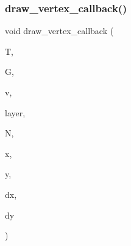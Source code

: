 \subsubsection{\texorpdfstring{draw\+\_\+vertex\+\_\+callback()}{draw\_vertex\_callback()}}
{\footnotesize\ttfamily void draw\+\_\+vertex\+\_\+callback (\begin{DoxyParamCaption}\item[{\mbox{\hyperlink{classtree}{tree}} $\ast$}]{T,  }\item[{\mbox{\hyperlink{classmp__graphics}{mp\+\_\+graphics}} $\ast$}]{G,  }\item[{\mbox{\hyperlink{galois_8h_a09fddde158a3a20bd2dcadb609de11dc}{I\+NT}} $\ast$}]{v,  }\item[{\mbox{\hyperlink{galois_8h_a09fddde158a3a20bd2dcadb609de11dc}{I\+NT}}}]{layer,  }\item[{\mbox{\hyperlink{classtree__node}{tree\+\_\+node}} $\ast$}]{N,  }\item[{\mbox{\hyperlink{galois_8h_a09fddde158a3a20bd2dcadb609de11dc}{I\+NT}}}]{x,  }\item[{\mbox{\hyperlink{galois_8h_a09fddde158a3a20bd2dcadb609de11dc}{I\+NT}}}]{y,  }\item[{\mbox{\hyperlink{galois_8h_a09fddde158a3a20bd2dcadb609de11dc}{I\+NT}}}]{dx,  }\item[{\mbox{\hyperlink{galois_8h_a09fddde158a3a20bd2dcadb609de11dc}{I\+NT}}}]{dy }\end{DoxyParamCaption})}

\mbox{\label{treedraw_8_c_ac40fdd8ab91b570efb82c2f7a37a545e}} 
